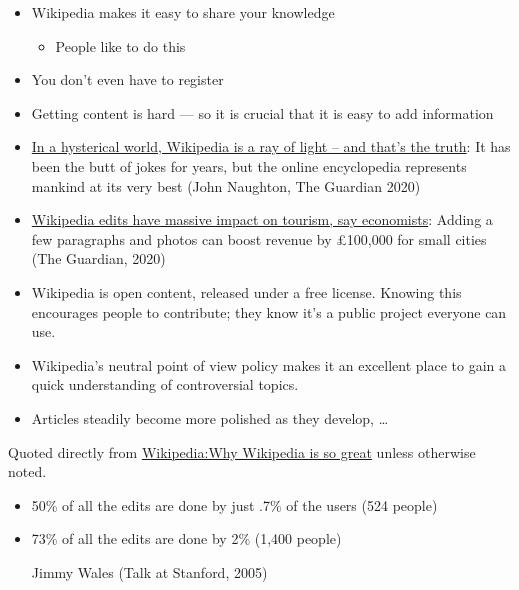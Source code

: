\documentclass[a4paper,landscape,headrule,footrule,xetex]{foils}
\begin{document}

\begin{itemize}
\item Wikipedia makes it easy to share your knowledge
  \begin{itemize}
    \item People like to do this
  \end{itemize}
\item You don't even have to register
\item Getting content is hard --- so it is crucial that it is easy to add information
\end{itemize}



\begin{itemize}%
\item
  \href{https://www.theguardian.com/commentisfree/2018/sep/02/in-hysterical-world-wikipedia-ray-of-light-truth}{In
    a hysterical world, Wikipedia is a ray of light – and that's the
    truth}: It has been the butt of jokes for years, but the online
  encyclopedia represents mankind at its very best (John Naughton, The
  Guardian 2020)
\item
  \href{https://www.theguardian.com/technology/2020/sep/18/wikipedia-edits-have-massive-impact-on-tourism-say-economists}{Wikipedia
    edits have massive impact on tourism, say economists}: Adding a
  few paragraphs and photos can boost revenue by £100,000 for small
  cities (The Guardian, 2020)
\item Wikipedia is open content, released under a free license. Knowing this encourages people to contribute; they know it's a public project everyone can use.
\item Wikipedia's neutral point of view policy makes it an excellent place to gain a quick understanding of controversial topics. 
\item Articles steadily become more polished as they develop, \ldots
 
\end{itemize}

Quoted directly from \href{https://en.wikipedia.org/wiki/Wikipedia:Why_Wikipedia_is_so_great}{Wikipedia:Why Wikipedia is so great} unless otherwise noted.


\begin{itemize}
\item 50\% of all the edits are done by just .7\% of the users (524 people)
\item 73\% of all the edits are done by 2\%  (1,400 people)
  \begin{flushright}
    Jimmy Wales (Talk at Stanford, 2005)
  \end{flushright}
\end{itemize}
\end{document}
